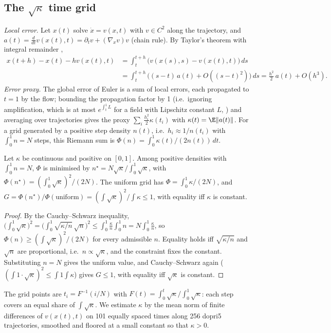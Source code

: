 \subsection{The $\sqrt\kappa$ time grid}\label{app:d5}
\emph{Local error.} Let $x(t)$ solve $\dot x=v(x,t)$ with $v\in C^2$ along the trajectory, and $a(t)=\frac{d}{dt}v(x(t),t)=\partial_tv+(\nabla_xv)v$ (chain rule). By Taylor's theorem with integral remainder \citep[\S II.2]{hairer1993ode},
\begin{align*}
x(t+h)-x(t)-hv(x(t),t)&=\int_t^{t+h}\big(v(x(s),s)-v(x(t),t)\big)\,ds\\
&=\int_t^{t+h}\big((s-t)\,a(t)+O((s-t)^2)\big)\,ds=\tfrac{h^2}{2}\,a(t)+O(h^3).
\end{align*}
\emph{Error proxy.} The global error of Euler is a sum of local errors, each propagated to $t=1$ by the flow; bounding the propagation factor by 1 (i.e.\ ignoring amplification, which is at most $e^{\int_t^1L}$ for a field with Lipschitz constant $L$, \citealp[Theorem~I.10.2]{hairer1993ode}) and averaging over trajectories gives the proxy $\sum_i\tfrac{h_i^2}{2}\kappa(t_i)$ with $\kappa(t)=\E\|a(t)\|$. For a grid generated by a positive step density $n(t)$, i.e.\ $h_i\approx1/n(t_i)$ with $\int_0^1n=N$ steps, this Riemann sum is $\Phi(n)=\int_0^1\kappa(t)/(2n(t))\,dt$.
\begin{proposition}\label{prop:grid}
Let $\kappa$ be continuous and positive on $[0,1]$. Among positive densities with $\int_0^1n=N$, $\Phi$ is minimised by $n^\star=N\sqrt\kappa/\!\int_0^1\sqrt\kappa$, with $\Phi(n^\star)=(\int_0^1\sqrt\kappa)^2/(2N)$. The uniform grid has $\Phi=\int_0^1\kappa/(2N)$, and $G=\Phi(n^\star)/\Phi(\text{uniform})=(\int\sqrt\kappa)^2/\!\int\kappa\le1$, with equality iff $\kappa$ is constant.
\end{proposition}
\begin{proof}
By the Cauchy--Schwarz inequality,
$\big(\int_0^1\sqrt\kappa\big)^2=\big(\int_0^1\sqrt{\kappa/n}\,\sqrt n\big)^2\le\int_0^1\frac{\kappa}{n}\int_0^1n=N\int_0^1\frac{\kappa}{n}$, so $\Phi(n)\ge(\int\sqrt\kappa)^2/(2N)$ for every admissible $n$. Equality holds iff $\sqrt{\kappa/n}$ and $\sqrt n$ are proportional, i.e.\ $n\propto\sqrt\kappa$, and the constraint fixes the constant. Substituting $n=N$ gives the uniform value, and Cauchy--Schwarz again ($(\int1\cdot\sqrt\kappa)^2\le\int1\int\kappa$) gives $G\le1$, with equality iff $\sqrt\kappa$ is constant.
\end{proof}
The grid points are $t_i=F^{-1}(i/N)$ with $F(t)=\int_0^t\sqrt\kappa/\!\int_0^1\sqrt\kappa$: each step covers an equal share of $\int\sqrt\kappa$. We estimate $\kappa$ by the mean norm of finite differences of $v(x(t),t)$ on 101 equally spaced times along 256 dopri5 trajectories, smoothed and floored at a small constant so that $\kappa>0$.

